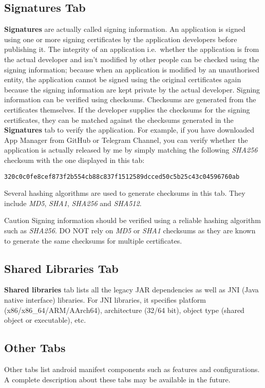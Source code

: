\subsection{Signatures Tab}\label{subsec:signatures-tab} %
\textbf{Signatures} are actually called signing information. An application is signed using one or more signing
certificates by the application developers before publishing it. The integrity of an application i.e.\ whether the
application is from the actual developer and isn't modified by other people can be checked using the signing information;
because when an application is modified by an unauthorised entity, the application cannot be signed using the original
certificates again because the signing information are kept private by the actual developer. Signing information can be
verified using checksums. Checksums are generated from the certificates themselves. If the developer supplies the
checksums for the signing certificates, they can be matched against the checksums generated in the \textbf{Signatures}
tab to verify the application. For example, if you have downloaded App Manager from GitHub or Telegram Channel, you can
verify whether the application is actually released by me by simply matching the following \textit{SHA256} checksum with
the one displayed in this tab:
\begin{Verbatim}
320c0c0fe8cef873f2b554cb88c837f1512589dcced50c5b25c43c04596760ab
\end{Verbatim}

Several hashing algorithms are used to generate checksums in this tab. They include \textit{MD5}, \textit{SHA1},
\textit{SHA256} and \textit{SHA512}.

\begin{danger}{Caution}
    Signing information should be verified using a reliable hashing algorithm such as \textit{SHA256}. DO NOT rely on
    \textit{MD5} or \textit{SHA1} checksums as they are known to generate the same checksums for multiple certificates.
\end{danger}

\subsection{Shared Libraries Tab}\label{subsec:shared-libs-tab} %
\textbf{Shared libraries} tab lists all the legacy JAR dependencies as well as JNI (Java native interface) libraries.
For JNI libraries, it specifies platform (x86/x86\_64/ARM/AArch64), architecture (32/64 bit), object type (shared object
or executable), etc.

\subsection{Other Tabs}\label{subsec:other-tabs} %
Other tabs list android manifest components such as features and configurations. A complete description
about these tabs may be available in the future.
